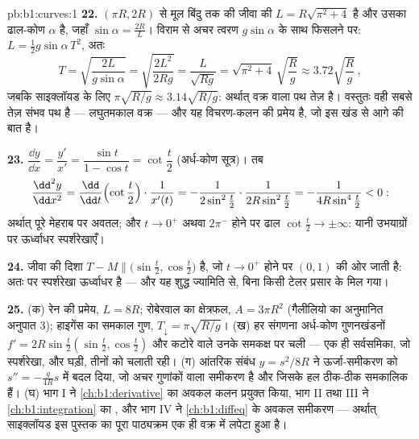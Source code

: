 \begin{solution}{pb:b1:curves:1}
\textbf{22.}  $(\pi R, 2R)$ से मूल बिंदु तक की जीवा की  $L =
R\sqrt{\pi^2 + 4}$ है और उसका ढाल-कोण $\alpha$ है, जहाँ $\sin\alpha =
\frac{2R}{L}$। विराम से अचर त्वरण $g\sin\alpha$ के साथ फिसलने पर: $L =
\frac12 g\sin\alpha\,T^2$, अतः
\[
T = \sqrt{\frac{2L}{g\sin\alpha}} = \sqrt{\frac{2L^2}{2Rg}}
= \frac{L}{\sqrt{Rg}} = \sqrt{\pi^2 + 4}\,\sqrt{\frac Rg}
\approx 3.72\sqrt{\frac Rg}\,,
\]
जबकि साइक्लॉयड के लिए $\pi\sqrt{R/g} \approx 3.14\sqrt{R/g}$: अर्थात् वक्र
वाला पथ तेज़ है। वस्तुतः वही सबसे तेज़ संभव पथ है --- लघुतमकाल वक्र --- और
यह विचरण-कलन की प्रमेय है, जो इस खंड से आगे की बात है।

\textbf{23.} $\dfrac{\dd y}{\dd x} = \dfrac{y'}{x'} = \dfrac{\sin t}{1 -
\cos t} = \cot\dfrac t2$ (अर्ध-कोण सूत्र)। तब
\[
\frac{\dd^2y}{\dd x^2}
= \frac{\dd}{\dd t}\Bigl(\cot\frac t2\Bigr)\cdot\frac{1}{x'(t)}
= -\frac{1}{2\sin^2\frac t2}\cdot\frac{1}{2R\sin^2\frac t2}
= -\frac{1}{4R\sin^4\frac t2} < 0 :
\]
अर्थात् पूरे मेहराब पर अवतल; और $t \to 0^+$ अथवा $2\pi^-$ होने पर ढाल
$\cot\frac t2 \to \pm\infty$: यानी उभयाग्रों पर ऊर्ध्वाधर स्पर्शरेखाएँ।

\textbf{24.} जीवा की दिशा $T - M \parallel \bigl(\sin\frac t2, \cos\frac
t2\bigr)$ है, जो $t \to 0^{+}$ होने पर $(0, 1)$ की ओर जाती है: अतः 
पर स्पर्शरेखा ऊर्ध्वाधर है --- और यह शुद्ध ज्यामिति से, बिना किसी टेलर
प्रसार के मिल गया।

\textbf{25.} (क) रेन की प्रमेय, $L = 8R$; रोबेरवाल का क्षेत्रफल, $A = 3\pi
R^2$ (गैलीलियो का अनुमानित अनुपात $3$); हाइगेंस का समकाल गुण, $T_\downarrow
= \pi\sqrt{R/g}$। (ख) हर संगणना अर्ध-कोण गुणनखंडनों $f' = 2R\sin\frac
t2(\sin\frac t2, \cos\frac t2)$ और कटोरे वाले उनके समकक्ष पर चली --- एक ही
सर्वसमिका, जो स्पर्शरेखा,  और घड़ी, तीनों को चलाती रही। (ग) आंतरिक
संबंध $y = s^2/8R$ ने ऊर्जा-समीकरण को $s'' = -\frac{g}{4R}s$ में बदल दिया,
जो अचर गुणांकों वाला  समीकरण है और जिसके हल ठीक-ठीक समकालिक हैं। (घ)
भाग I ने \cref{ch:b1:derivative} का अवकल कलन प्रयुक्त किया, भाग II तथा III
ने \cref{ch:b1:integration} का , और भाग IV ने \cref{ch:b1:diffeq} के
अवकल समीकरण --- अर्थात् साइक्लॉयड इस पुस्तक का पूरा पाठ्यक्रम एक ही वक्र में
लपेटा हुआ है।
\end{solution}
